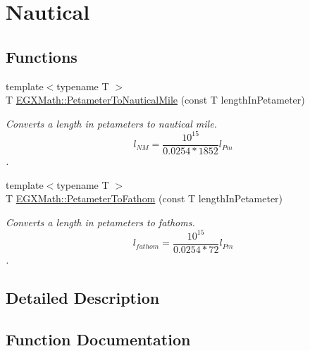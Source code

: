 \hypertarget{group___e_g_x_math-_conversions-_length_conversions-_s_i-_petameter-_nautical}{}\section{Nautical}
\label{group___e_g_x_math-_conversions-_length_conversions-_s_i-_petameter-_nautical}
\subsection*{Functions}
\begin{DoxyCompactItemize}
\item 
{\footnotesize template$<$typename T $>$ }\\T \mbox{\hyperlink{group___e_g_x_math-_conversions-_length_conversions-_s_i-_petameter-_nautical_gad71d96fd4a94e830ae0e768a41d993af}{E\+G\+X\+Math\+::\+Petameter\+To\+Nautical\+Mile}} (const T length\+In\+Petameter)
\begin{DoxyCompactList}\small\item\em Converts a length in petameters to nautical mile. \[ l_{NM}= \frac{10^{15}}{0.0254 * 1852} l_{Pm} \]. \end{DoxyCompactList}\item 
{\footnotesize template$<$typename T $>$ }\\T \mbox{\hyperlink{group___e_g_x_math-_conversions-_length_conversions-_s_i-_petameter-_nautical_ga889ce7d71b84adea6f568fed8857fbab}{E\+G\+X\+Math\+::\+Petameter\+To\+Fathom}} (const T length\+In\+Petameter)
\begin{DoxyCompactList}\small\item\em Converts a length in petameters to fathoms. \[ l_{fathom}= \frac{10^{15}}{0.0254 * 72} l_{Pm} \]. \end{DoxyCompactList}\end{DoxyCompactItemize}


\subsection{Detailed Description}


\subsection{Function Documentation}
\mbox{\label{group___e_g_x_math-_conversions-_length_conversions-_s_i-_petameter-_nautical_ga889ce7d71b84adea6f568fed8857fbab}} 
